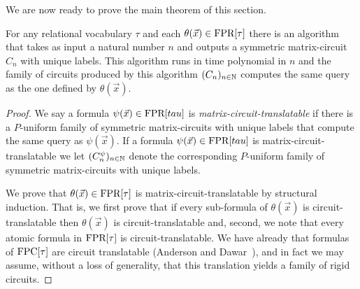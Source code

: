 \documentclass[../paper.tex]{subfiles}
\begin{document}

We are now ready to prove the main theorem of this section.

\begin{thm}
  For any relational vocabulary $\tau$ and each $\theta(\vec{x}) \in \text{\upshape FPR}[\tau]$
  there is an algorithm that takes as input a natural number $n$ and outputs a
  symmetric matrix-circuit $C_n$ with unique labels. This algorithm runs in time
  polynomial in $n$ and the family of circuits produced by this algorithm
  $(C_n)_{n \in \mathbb{N}}$ computes the same query as the one defined by
  $\theta(\vec{x})$.
\end{thm}

\begin{proof}
  We say a formula $\psi(\vec{x}) \in \text{\upshape FPR}[tau]$ is
  \emph{matrix-circuit-translatable} if there is a $P$-uniform family of
  symmetric matrix-circuits with unique labels that compute the same query as
  $\psi(\vec{x})$. If a formula $\psi(\vec{x}) \in \text{\upshape FPR}[tau]$ is
  matrix-circuit-translatable we let $(C^\psi_n)_{n \in \mathbb{N}}$ denote the
  corresponding $P$-uniform family of symmetric matrix-circuits with unique
  labels.

  We prove that $\theta(\vec{x}) \in \text{\upshape FPR}[\tau]$ is matrix-circuit-translatable
  by structural induction. That is, we first prove that if every sub-formula of
  $\theta(\vec{x})$ is circuit-translatable then $\theta(\vec{x})$ is
  circuit-translatable and, second, we note that every atomic formula in
  $\text{\upshape FPR}[\tau]$ is circuit-translatable. We have already that formulas of
  $\text{\upshape FPC}[\tau]$ are circuit translatable (Anderson and Dawar~\cite{AndersonD17}),
  and in fact we may assume, without a loss of generality, that this translation
  yields a family of rigid circuits.
  
  

\end{proof}
\end{document}
